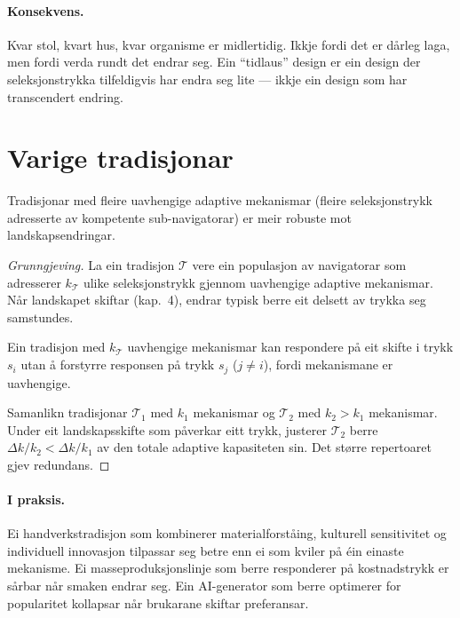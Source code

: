 \paragraph{Konsekvens.}
Kvar stol, kvart hus, kvar organisme er midlertidig. Ikkje fordi
det er dårleg laga, men fordi verda rundt det endrar seg. Ein
``tidlaus'' design er ein design der seleksjonstrykka tilfeldigvis
har endra seg lite --- ikkje ein design som har transcendert
endring.


\section{Varige tradisjonar}

\begin{satmark}\label{thm:L.9.2}
Tradisjonar med fleire uavhengige adaptive mekanismar (fleire
seleksjonstrykk adresserte av kompetente sub-navigatorar) er meir
robuste mot landskapsendringar.
\end{satmark}

\begin{proof}[Grunngjeving]
La ein tradisjon $\mathcal{T}$ vere ein populasjon av navigatorar
som adresserer $k_\mathcal{T}$ ulike seleksjonstrykk gjennom
uavhengige adaptive mekanismar. Når landskapet skiftar (kap.~4),
endrar typisk berre eit delsett av trykka seg samstundes.

Ein tradisjon med $k_\mathcal{T}$ uavhengige mekanismar kan
respondere på eit skifte i trykk $s_i$ utan å forstyrre responsen
på trykk $s_j$ ($j \neq i$), fordi mekanismane er uavhengige.

Samanlikn tradisjonar $\mathcal{T}_1$ med $k_1$ mekanismar og
$\mathcal{T}_2$ med $k_2 > k_1$ mekanismar. Under eit
landskapsskifte som påverkar eitt trykk, justerer $\mathcal{T}_2$
berre $\Delta k / k_2 < \Delta k / k_1$ av den totale adaptive
kapasiteten sin. Det større repertoaret gjev redundans.
\end{proof}

\paragraph{I praksis.}
Ei handverkstradisjon som kombinerer materialforståing, kulturell
sensitivitet og individuell innovasjon tilpassar seg betre enn
ei som kviler på éin einaste mekanisme. Ei masseproduksjonslinje
som berre responderer på kostnadstrykk er sårbar når smaken
endrar seg. Ein AI-generator som berre optimerer for popularitet
kollapsar når brukarane skiftar preferansar.


